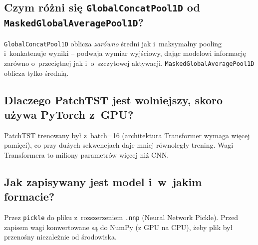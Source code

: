 \documentclass[12pt,a4paper]{article}
\begin{document}
\subsection*{Czym różni się \texttt{GlobalConcatPool1D} od \texttt{MaskedGlobalAveragePool1D}?}
\texttt{GlobalConcatPool1D} oblicza \textit{zarówno} średni jak i~maksymalny pooling i~konkatenuje wyniki -- podwaja wymiar wyjściowy, dając modelowi informację zarówno o~przeciętnej jak i~o~szczytowej aktywacji. \texttt{MaskedGlobalAveragePool1D} oblicza tylko średnią.

\subsection*{Dlaczego PatchTST jest wolniejszy, skoro używa PyTorch z~GPU?}
PatchTST trenowany był z~batch=16 (architektura Transformer wymaga więcej pamięci), co przy dużych sekwencjach daje mniej równoległy trening. Wagi Transformera to miliony parametrów więcej niż CNN.

\subsection*{Jak zapisywany jest model i~w~jakim formacie?}
Przez \texttt{pickle} do pliku z~rozszerzeniem \texttt{.nnp} (Neural Network Pickle). Przed zapisem wagi konwertowane są do NumPy (z GPU na CPU), żeby plik był przenośny niezależnie od środowiska.
\end{document}
